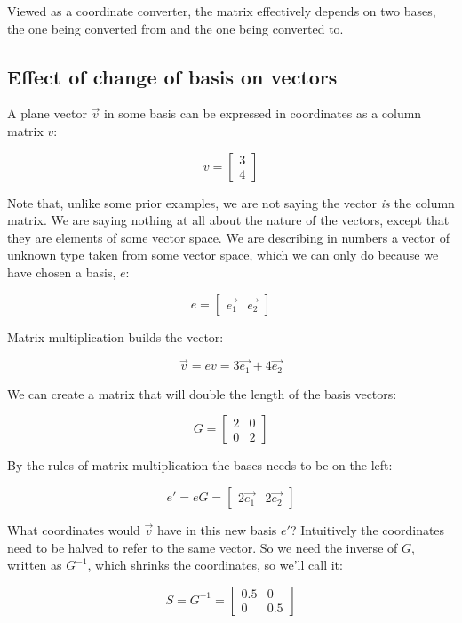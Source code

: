 Viewed as a coordinate converter, the matrix effectively depends on two bases, the one being converted from and the one being converted to.

\subsection{Effect of change of basis on vectors}

A plane vector $\vec{v}$ in some basis can be expressed in coordinates as a column matrix $v$:

$$v = \begin{bmatrix}3 \\ 4\end{bmatrix}$$

Note that, unlike some prior examples, we are not saying the vector \textit{is} the column matrix. We are saying nothing at all about the nature of the vectors, except that they are elements of some vector space. We are describing in numbers a vector of unknown type taken from some vector space, which we can only do because we have chosen a basis, $e$:

$$e = \begin{bmatrix}\vec{e_1} & \vec{e_2}\end{bmatrix}$$

Matrix multiplication builds the vector:

$$\vec{v} = ev = 3\vec{e_1} + 4\vec{e_2}$$

We can create a matrix that will double the length of the basis vectors:

$$G = \begin{bmatrix}2 & 0 \\ 0 & 2\end{bmatrix}$$

By the rules of matrix multiplication the bases needs to be on the left:

$$e' = eG = \begin{bmatrix}2\vec{e_1} & 2\vec{e_2}\end{bmatrix}$$

What coordinates would $\vec{v}$ have in this new basis $e'$? Intuitively the coordinates need to be halved to refer to the same vector. So we need the inverse of $G$, written as $G^{-1}$, which shrinks the coordinates, so we'll call it:

$$S = G^{-1} = \begin{bmatrix}0.5 & 0 \\ 0 & 0.5\end{bmatrix}$$

